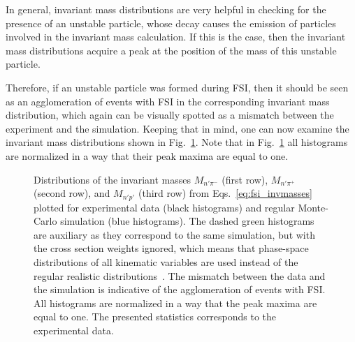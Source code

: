 \newpage
In general, invariant mass distributions are very helpful in checking for the presence of an unstable particle, whose decay causes the emission of particles involved in the invariant mass calculation. If this is the case, then the invariant mass distributions acquire a peak at the position of the mass of this unstable particle. 

Therefore, if an unstable particle was formed during FSI, then it should be seen as an agglomeration of events with FSI in the corresponding invariant mass distribution, which again can be visually spotted as a mismatch between the experiment and the simulation. Keeping that in mind, one can now examine the invariant mass distributions shown in Fig.~\ref{fig:inv_m}. Note that in Fig.~\ref{fig:inv_m} all histograms are normalized in a way that their peak maxima are equal to one. 

\begin{figure}[!ht]
\begin{center}
\end{center}
\caption{\small Distributions of the invariant masses $M_{n'\pi^{-}}$ (first row), $M_{n'\pi^{+}}$ (second row), and $M_{n'p'}$ (third row) from Eqs.~\eqref{eq:fsi_invmasses} plotted for experimental data (black histograms) and regular Monte-Carlo simulation (blue histograms). The dashed green histograms are auxiliary as they correspond to the same simulation, but with the cross section weights ignored, which means that phase-space distributions of all kinematic variables are used instead of the regular realistic distributions~\cite{twopeg,twopeg-d}. The mismatch between the data and the simulation is indicative of the agglomeration of events with FSI. All histograms are normalized in a way that the peak maxima are equal to one. The presented statistics corresponds to the experimental data.}
\label{fig:inv_m}
\end{figure}


